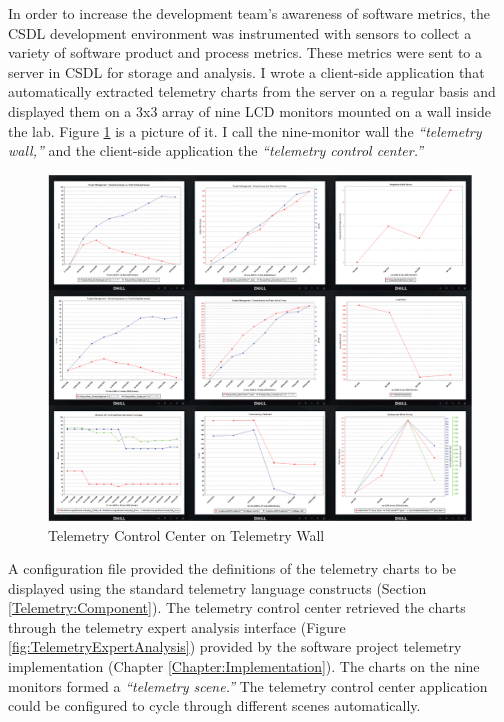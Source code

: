 
In order to increase the development team's awareness of software metrics, the CSDL development environment was instrumented with sensors to collect a variety of software product and process metrics. These metrics were sent to a server in CSDL for storage and analysis. I wrote a client-side application that automatically extracted telemetry charts from the server on a regular basis and displayed them on a 3x3 array of nine LCD monitors mounted on a wall inside the lab. Figure \ref{fig:TelemetryWall} is a picture of it. I call the nine-monitor wall the \textit{``telemetry wall,''} and the client-side application the \textit{``telemetry control center.''}

\begin{figure}[p]
  \center
  \includegraphics[width=1.00\textwidth]{figures/TelemetryWall}
  \caption{Telemetry Control Center on Telemetry Wall} 
  \label{fig:TelemetryWall}
\end{figure}

A configuration file provided the definitions of the telemetry charts to be displayed
using the standard telemetry language constructs (Section \ref{Telemetry:Component}). The telemetry control center retrieved the charts through the telemetry expert analysis interface (Figure \ref{fig:TelemetryExpertAnalysis}) provided by the software project telemetry implementation (Chapter  \ref{Chapter:Implementation}). The charts on the nine monitors formed a \textit{``telemetry scene.''} The telemetry control center application could be configured to cycle through different scenes automatically. 

